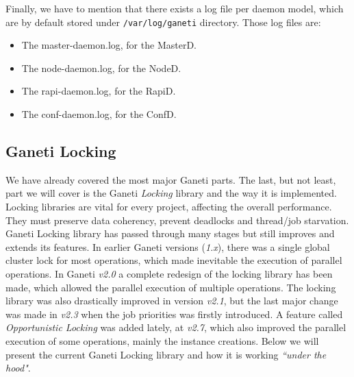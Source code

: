 Finally, we have to mention that there exists a log file per daemon model, which
are by default stored under \texttt{/var/log/ganeti} directory. Those log files
are:

\begin{itemize}
  \item The master-daemon.log, for the MasterD.
  \item The node-daemon.log, for the NodeD.
  \item The rapi-daemon.log, for the RapiD.
  \item The conf-daemon.log, for the ConfD.
\end{itemize}

\subsection{Ganeti Locking}\label{subsec:locks}

We have already covered the most major Ganeti parts. The last, but not least,
part we will cover is the Ganeti \emph{Locking} library and the way it is
implemented. Locking libraries are vital for every project, affecting the overall
performance. They must preserve data coherency, prevent deadlocks and thread/job
starvation. Ganeti Locking library has passed through many stages but still
improves and extends its features. In earlier Ganeti versions (\emph{1.x}),
there was a single global cluster lock for most operations, which made
inevitable the execution of parallel operations. In Ganeti \emph{v2.0} a
complete redesign of the locking library has been made, which allowed the
parallel execution of multiple operations. The locking library was also
drastically improved in version \emph{v2.1}, but the last major change was made
in \emph{v2.3} when the job priorities was firstly introduced. A feature called
\emph{Opportunistic Locking} was added lately, at \emph{v2.7}, which also
improved the parallel execution of some operations, mainly the instance
creations. Below we will present the current Ganeti Locking library and how
it is working \emph{``under the hood"}.

